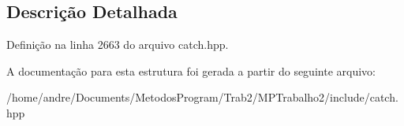 \subsection{Descrição Detalhada}


Definição na linha 2663 do arquivo catch.\+hpp.



A documentação para esta estrutura foi gerada a partir do seguinte arquivo\+:\begin{DoxyCompactItemize}
\item 
/home/andre/\+Documents/\+Metodos\+Program/\+Trab2/\+M\+P\+Trabalho2/include/catch.\+hpp\end{DoxyCompactItemize}
